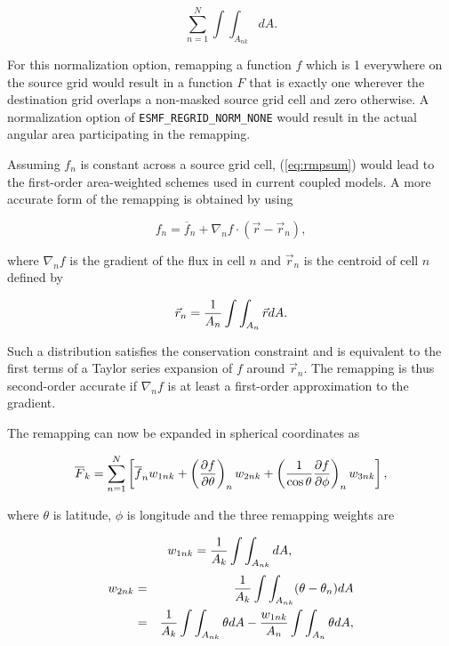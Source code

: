 \begin{equation}
\sum_{n=1}^N \int\int_{A_{nk}}dA.
\end{equation}

     For this normalization option, remapping a function $f$ which is 1
     everywhere on the source grid would result in a function $F$ that is
     exactly one wherever the destination grid overlaps a non-masked source
     grid cell and zero otherwise.  A normalization option of
     {\tt ESMF\_REGRID\_NORM\_NONE} would result in the actual angular area
     participating in the remapping.

     Assuming $f_n$ is constant across a source grid cell, (\ref{eq:rmpsum})
     would lead to the first-order area-weighted schemes used in current coupled
     models.  A more accurate form of the remapping is obtained by using 

\begin{equation}\label{eq:gradient}
f_n = \overline{f}_n + 
                   \nabla_n f\cdot({\vec{r}} - \vec{r}_n),
\end{equation}

     where $\nabla_n f$ is the gradient of the flux in cell $n$ and $\vec{r}_n$
     is the centroid of cell $n$ defined by

 \begin{equation}\label{eq:centroid}
\vec{r}_n = {1\over{A_n}}\int\int_{A_n}\vec{r}dA.
\end{equation}

     Such a distribution satisfies the conservation constraint and is equivalent
     to the first terms of a Taylor series expansion of $f$ around $\vec{r}_n$.
     The remapping is thus second-order accurate if $\nabla_n f$ is at least a 
     first-order approximation to the gradient.

     The remapping can now be expanded in spherical coordinates as 

\begin{equation}\label{eq:remap}
\overline{F}_k = \sum_{n=1}^{N} \left[\overline{f}_n w_{1nk} + 
\left({{\partial f}\over{\partial \theta}}\right)_n w_{2nk} +
\left({1\over{\cos\theta}}{{\partial f}\over{\partial \phi}}\right)_n w_{3nk}
\right],
\end{equation}

     where $\theta$ is latitude, $\phi$ is longitude and the three remapping
     weights are

\begin{equation}\label{eq:weights1}
w_{1nk} = {1\over{A_k}}\int\int_{A_{nk}}dA, \\
\end{equation}
\begin{eqnarray}\label{eq:weights2}
w_{2nk} & = & {1\over{A_k}}\int\int_{A_{nk}}(\theta-\theta_n)dA \nonumber \\
        & = & {1\over{A_k}}\int\int_{A_{nk}}\theta dA -
              {{w_{1nk}}\over{A_n}}\int\int_{A_n}\theta dA,
\end{eqnarray}

